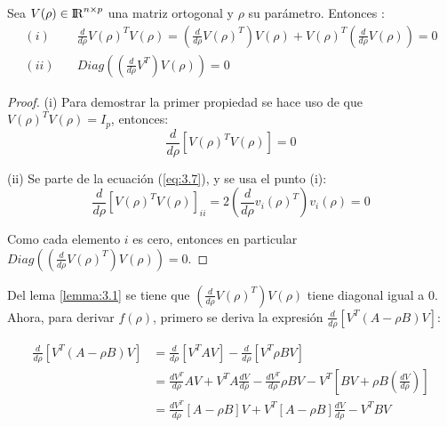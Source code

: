 \bigskip

\begin{lemma}\label{lemma:3.1}
Sea $V(\rho) \in {\rm I\!R}^{n \times p}$ una matriz ortogonal y $\rho$ su parámetro. Entonces \cite{ngo2012trace}:
\begin{equation*}
\begin{aligned}
(i)&  \quad \frac{d}{d\rho} V(\rho)^TV(\rho) = \left(\frac{d}{d\rho}V(\rho)^T\right) V(\rho)  + V(\rho)^T  \left( \frac{d}{d\rho} V(\rho) \right) = 0 \\
(ii)& \quad Diag \left(\left(\frac{d}{d\rho}V^T \right)V(\rho) \right) = 0 
\end{aligned}
\end{equation*}
\end{lemma}

\begin{proof}
\bigskip
(i) Para demostrar la primer propiedad se hace uso de que $V(\rho)^T V(\rho) = I_p$, entonces:
\begin{equation*}
\frac{d}{d\rho} [V(\rho)^T V(\rho)] = 0  
\end{equation*}

(ii) Se parte de la ecuación (\ref{eq:3.7}), y se usa el punto (i):
\begin{equation*}
  \frac{d}{d\rho} [V(\rho)^T V(\rho)]_{ii} =    2 \left( \frac{d}{d\rho}v_i(\rho)^T \right)  v_i(\rho) = 0
\end{equation*}

Como cada elemento $i$ es cero, entonces en particular $Diag\left( \left(\frac{d}{d\rho}V(\rho)^T \right) V(\rho) \right)=0 $.
\end{proof}

Del lema \ref{lemma:3.1} se tiene que $\left(\frac{d}{d\rho}V(\rho)^T \right) V(\rho)$ tiene diagonal igual a 0. Ahora, para derivar $f(\rho)$, primero se deriva la expresión $\frac{d}{d\rho}\left[V^T (A-\rho B)V \right]$:

\begin{equation}\label{eq:3.8}
\begin{aligned}
	\frac{d}{d\rho}\left[V^T (A-\rho B)V \right] & = \frac{d}{d\rho} \left[V^T A V \right]- \frac{d}{d\rho}\left[V^T \rho B V\right] \\
	& = \frac{dV^T}{d\rho}  AV +  V^T A \frac{dV}{d\rho} - \frac{dV^T}{d\rho} \rho BV - V^T \left[BV + \rho B \left(\frac{dV}{d\rho} \right) \right] \\
	& = \frac{dV^T}{d\rho} \left[A -\rho B \right] V + V^T \left[A- \rho B \right]\frac{dV}{d\rho} - V^TBV \\
\end{aligned} 
\end{equation}


